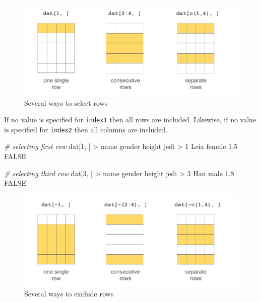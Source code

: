 \documentclass[
]{book}
\newenvironment{Shaded}{\begin{snugshade}}{\end{snugshade}}
\newcommand{\CommentTok}[1]{\textcolor[rgb]{0.56,0.35,0.01}{\textit{#1}}}
\newcommand{\ConstantTok}[1]{\textcolor[rgb]{0.00,0.00,0.00}{#1}}
\newcommand{\DecValTok}[1]{\textcolor[rgb]{0.00,0.00,0.81}{#1}}
\newcommand{\FloatTok}[1]{\textcolor[rgb]{0.00,0.00,0.81}{#1}}
\newcommand{\NormalTok}[1]{#1}
\newcommand{\SpecialCharTok}[1]{\textcolor[rgb]{0.00,0.00,0.00}{#1}}
\begin{document}
\begin{figure}

{\centering \includegraphics[width=0.8\linewidth]{images/objects/obj-dataframe-rows1} 

}

\caption{Several ways to select rows}\label{fig:unnamed-chunk-177}
\end{figure}

If no value is specified for \texttt{index1} then all rows are included. Likewise,
if no value is specified for \texttt{index2} then all columns are included.

\begin{Shaded}
\begin{Highlighting}[]
\CommentTok{\# selecting first row}
\NormalTok{dat[}\DecValTok{1}\NormalTok{, ]}
\SpecialCharTok{\textgreater{}}\NormalTok{   name gender height  jedi}
\SpecialCharTok{\textgreater{}} \DecValTok{1}\NormalTok{ Leia female    }\FloatTok{1.5} \ConstantTok{FALSE}

\CommentTok{\# selecting third row}
\NormalTok{dat[}\DecValTok{3}\NormalTok{, ]}
\SpecialCharTok{\textgreater{}}\NormalTok{   name gender height  jedi}
\SpecialCharTok{\textgreater{}} \DecValTok{3}\NormalTok{  Han   male    }\FloatTok{1.8} \ConstantTok{FALSE}
\end{Highlighting}
\end{Shaded}

\begin{figure}

{\centering \includegraphics[width=0.8\linewidth]{images/objects/obj-dataframe-rows2} 

}

\caption{Several ways to exclude rows}\label{fig:unnamed-chunk-179}
\end{figure}
\end{document}
